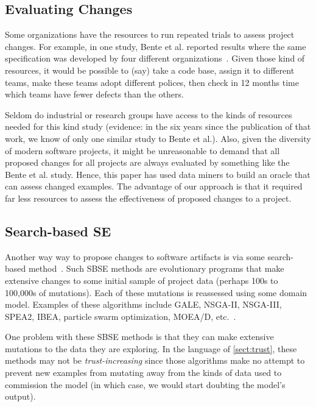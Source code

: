 \documentclass{sig-alternate}
\newcommand{\tion}[1]{\textsection\ref{sect:#1}}
\begin{document}
\subsection{Evaluating Changes}

Some organizations have the resources to 
run repeated trials to assess  project changes.
For example, in one   study, Bente et al. reported results
where the same  specification was developed by four different organizations~\cite{Anda2009}. Given those kind of resources, it would be possible
to (say) take a code base, assign it to different teams, make these teams  adopt different polices,
then check in 12 months time
 which teams have fewer defects than the others.  
 

Seldom do industrial or research groups have access
to the kinds of resources needed for this kind study  (evidence: in the six years since the
publication of that work, we know of only one   similar study to Bente et al.). Also, given the
diversity of modern software projects, it might be unreasonable to demand that all
proposed changes for all projects are always evaluated by something like the Bente et al. study.
Hence, this paper has used data miners to build an oracle that can assess changed examples. The advantage
of our approach is that it required far less resources to assess the effectiveness of proposed
changes to a project.  

\subsection{Search-based SE}

Another way way to propose changes to software artifacts
is   via some search-based method~\cite{Harman2009,Harman2011}. Such SBSE methods are   evolutionary programs that 
make
 extensive changes to  some initial sample of project data
 (perhaps 
100s to 100,000s of mutations). Each of these mutations
is reassessed using some domain model.
Examples of these algorithms include GALE, NSGA-II, NSGA-III, SPEA2, IBEA, particle swarm optimization, MOEA/D, etc.~\cite{krall14,deb00a,zit02,zit04,%
deb14,Cui2005a,zhang07:TEC}.

One problem with these   SBSE methods is that they can  make extensive mutations to the data they are exploring. In the language
of \tion{trust}, these methods may not be {\em trust-increasing} since those algorithms make no attempt
to prevent new examples from mutating away from the kinds of data used to commission the model (in which case, we would
start doubting the model's output).
\end{document}
